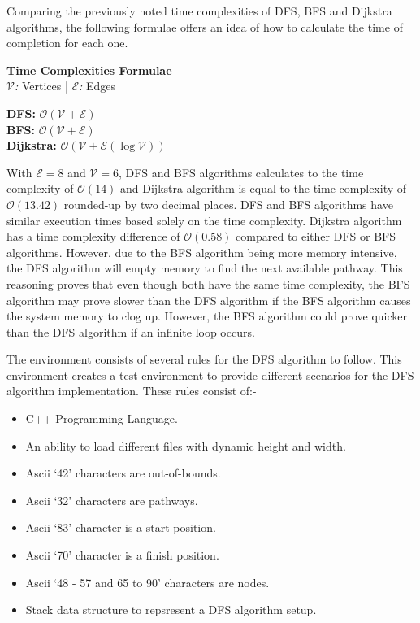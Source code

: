 \documentclass[conference]{IEEEtran}
\begin{document}
      Comparing the previously noted time complexities of DFS, BFS and Dijkstra algorithms, the following formulae offers an idea of how to calculate the time of completion for each one.
      \begin{center}
        \textbf{Time Complexities Formulae}\\
        \textit{$\mathcal{V}$:} Vertices | \textit{$\mathcal{E}$:} Edges

        \textbf{DFS:} $\mathcal{O}(\mathcal{V} + \mathcal{E})$\\
        \textbf{BFS:} $\mathcal{O}(\mathcal{V} + \mathcal{E})$\\
        \textbf{Dijkstra:} $\mathcal{O}(\mathcal{V} + \mathcal{E}(\log\mathcal{V}))$
      \end{center}

      With ${\mathcal{E} = 8}$ and $\mathcal{V} = 6$, DFS and BFS algorithms calculates to the time complexity of $\mathcal{O}(14)$ and Dijkstra algorithm is equal to the time complexity of $\mathcal{O}(13.42)$ rounded-up by two decimal places. DFS and BFS algorithms have similar execution times based solely on the time complexity. Dijkstra algorithm has a time complexity difference of $\mathcal{O}(0.58)$ compared to either DFS or BFS algorithms. However, due to the BFS algorithm being more memory intensive, the DFS algorithm will empty memory to find the next available pathway. This reasoning proves that even though both have the same time complexity, the BFS algorithm may prove slower than the DFS algorithm if the BFS algorithm causes the system memory to clog up. However, the BFS algorithm could prove quicker than the DFS algorithm if an infinite loop occurs.

      The environment consists of several rules for the DFS algorithm to follow. This environment creates a test environment to provide different scenarios for the DFS algorithm implementation. These rules consist of:-
      \begin{itemize}
        \item C++ Programming Language.
        \item An ability to load different files with dynamic height and width.
        \item Ascii `42' characters are out-of-bounds.
        \item Ascii `32' characters are pathways.
        \item Ascii `83' character is a start position.
        \item Ascii `70' character is a finish position.
        \item Ascii `48 - 57 and 65 to 90' characters are nodes.
        \item Stack data structure to repsresent a DFS algorithm setup.
      \end{itemize}
\end{document}
